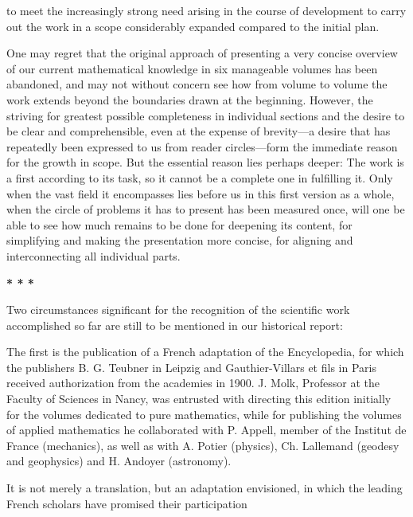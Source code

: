 \thispagestyle{fancy}

\vspace{0.5cm}

to meet the increasingly strong need arising in the course of development to carry out the work in a scope considerably expanded compared to the initial plan.

One may regret that the original approach of presenting a very concise overview of our current mathematical knowledge in six manageable volumes has been abandoned, and may not without concern see how from volume to volume the work extends beyond the boundaries drawn at the beginning. However, the striving for greatest possible completeness in individual sections and the desire to be clear and comprehensible, even at the expense of brevity—a desire that has repeatedly been expressed to us from reader circles—form the immediate reason for the growth in scope. But the essential reason lies perhaps deeper: The work is a first according to its task, so it cannot be a complete one in fulfilling it. Only when the vast field it encompasses lies before us in this first version as a whole, when the circle of problems it has to present has been measured once, will one be able to see how much remains to be done for deepening its content, for simplifying and making the presentation more concise, for aligning and interconnecting all individual parts.

\vspace{0.5cm}

\centerline{\textbf{* * *}}

\vspace{0.5cm}

Two circumstances significant for the recognition of the scientific work accomplished so far are still to be mentioned in our historical report:

The first is the publication of a French adaptation of the Encyclopedia, for which the publishers B. G. Teubner in Leipzig and Gauthier-Villars et fils in Paris received authorization from the academies in 1900. J. Molk, Professor at the Faculty of Sciences in Nancy, was entrusted with directing this edition initially for the volumes dedicated to pure mathematics, while for publishing the volumes of applied mathematics he collaborated with P. Appell, member of the Institut de France (mechanics), as well as with A. Potier (physics), Ch. Lallemand (geodesy and geophysics) and H. Andoyer (astronomy).

It is not merely a translation, but an adaptation envisioned, in which the leading French scholars have promised their participation

